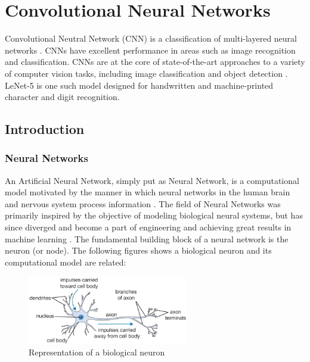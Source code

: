 \chapter{Convolutional Neural Networks}
\label{ch5_cnn}

Convolutional Neutral Network (CNN) is a classification of multi-layered neural networks \cite{cnn_lecun_lenet5}. CNNs have excellent performance in areas such as image recognition and classification.  CNNs are at the core of state-of-the-art approaches to a variety of computer vision tasks, including image classification \cite{kriz_suts_hinton_nips2012} and object detection \cite{gir_don_dar_mal_cvpr2014}. LeNet-5 is one such model designed for handwritten and machine-printed character and digit recognition.  

\section{Introduction}
\label{sect5_1}

\subsection{Neural Networks}
\label{sect5_1_1}
An Artificial Neural Network, simply put as Neural Network, is a computational model motivated by the manner in which neural networks in the human brain and nervous system process information \cite{cnn_karn}. The field of Neural Networks was primarily inspired by the objective of modeling biological neural systems, but has since diverged and become a part of engineering and achieving great results in machine learning \cite{nn_stanford_1}. \newline\newline The fundamental building block of a neural network is the neuron (or node). The following figures shows a biological neuron and its computational model are related:

\begin{figure}[h!]
\centering
\includegraphics[width=7cm]{figures/Neuron.png}
\caption{Representation of a biological neuron\cite{nn_stanford_1}}
\label{fig:cnn1}
\end{figure}


